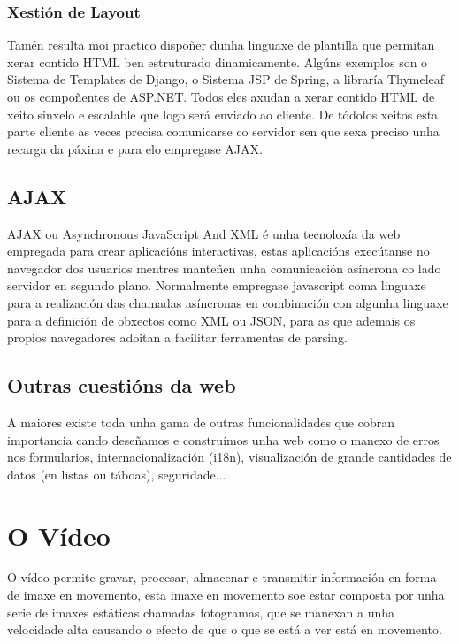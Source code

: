         \subsubsection{Xestión de Layout}
            Tamén resulta moi practico dispoñer dunha linguaxe de plantilla que permitan xerar contido
            HTML ben estruturado dinamicamente. Algúns exemplos son o Sistema de Templates de Django, o 
            Sistema JSP de Spring, a libraría Thymeleaf ou os compoñentes de ASP.NET. Todos eles axudan 
            a xerar contido HTML de xeito sinxelo e escalable que logo será enviado ao cliente. De
            tódolos xeitos esta parte cliente as veces precisa comunicarse co servidor sen que sexa 
            preciso unha recarga da páxina e para elo empregase AJAX.
		
    \subsection{AJAX}
		AJAX ou Asynchronous JavaScript And XML é unha tecnoloxía da web empregada para crear 
		aplicacións interactivas, estas aplicacións execútanse no navegador dos usuarios mentres 
		manteñen unha comunicación asíncrona co lado servidor en segundo plano. Normalmente 
		empregase javascript coma linguaxe para a realización das chamadas asíncronas en combinación
		con algunha linguaxe para a definición de obxectos como XML ou JSON, para as que ademais os
		propios navegadores adoitan a facilitar ferramentas de parsing.
		
	\subsection{Outras cuestións da web}
		A maiores existe toda unha gama de outras funcionalidades que cobran importancia cando deseñamos
		e construímos unha web como o manexo de erros nos formularios, internacionalización (i18n), 
		visualización de grande cantidades de datos (en listas ou táboas), seguridade...
		
		
\section{O Vídeo}
    O vídeo permite gravar, procesar, almacenar e transmitir información en forma de 
    imaxe en movemento, esta imaxe en movemento soe estar composta por unha serie de imaxes 
    estáticas chamadas fotogramas, que se manexan a unha velocidade alta causando o efecto de que o
    que se está a ver está en movemento.
    
